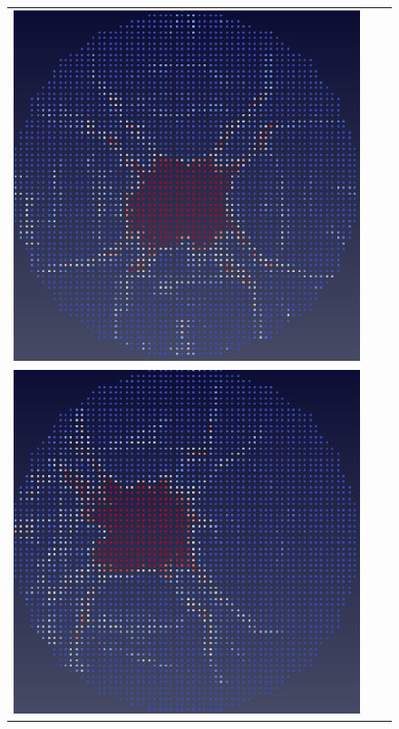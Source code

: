 \begin{figure}
\begin{tabular}{ccc}
  \includegraphics[scale=0.3]{figure/Solutions/solution_202.eps} \\
  \includegraphics[scale=0.3]{figure/Solutions/solution_2000.eps} &

\end{tabular}
\end{figure}
